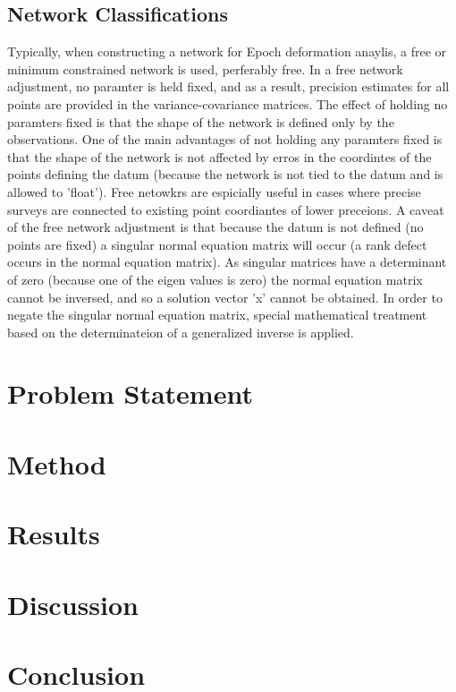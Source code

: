 \documentclass{article}
\begin{document}
\subsection{Network Classifications}
Typically, when constructing a network for Epoch deformation anaylis,
a free or minimum constrained network is used, perferably free. In a free
network adjustment, no paramter is held fixed, and as a result, precision
estimates for all points are provided in the variance-covariance matrices.
The effect of holding no paramters fixed is that the shape of the network
is defined only by the observations. One of the main advantages of not holding
any paramters fixed is that the shape of the network is not affected by erros in
the coordintes of the points defining the datum (because the network is not tied
to the datum and is allowed to 'float'). Free netowkrs are espicially useful
in cases where precise surveys are connected to existing point coordiantes
of lower preceions. A caveat of the free network adjustment is that because the
datum is not defined (no points are fixed) a singular normal equation matrix
will occur (a rank defect occurs in the normal equation matrix).
As singular matrices have a determinant of zero (because one of the
eigen values is zero) the normal equation matrix cannot be inversed, and so
a solution vector 'x' cannot be obtained. In order to negate the singular normal
equation matrix, special mathematical treatment based on the determinateion of a
generalized inverse is applied.

\section{Problem Statement}

\section{Method}

\section{Results}

\section{Discussion}

\section{Conclusion}
\end{document}
